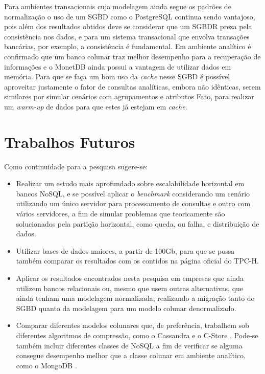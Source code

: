 Para ambientes transacionais cuja modelagem ainda segue os padrões de normalização o uso de um SGBD como o PostgreSQL continua sendo vantajoso, pois além dos resultados obtidos deve se considerar que um SGBDR preza pela consistência nos dados, e para um sistema transacional que envolva transações bancárias, por exemplo, a consistência é fundamental. Em ambiente analítico é confirmado que um banco colunar traz melhor desempenho para a recuperação de informações e o MonetDB ainda possui a vantagem de utilizar dados em memória. Para que se faça um bom uso da \textit{cache} nesse SGBD é possível aproveitar justamente o fator de consultas analíticas, embora não idênticas, serem similares por simular cenários com agrupamentos e atributos Fato, para realizar um \textit{warm-up} de dados para que estes já estejam em \textit{cache}.

\section{Trabalhos Futuros}

Como continuidade para a pesquisa sugere-se:

\begin{itemize}
    \item Realizar um estudo mais aprofundado sobre escalabilidade horizontal em bancos NoSQL, e se possível aplicar o \textit{benchmark} considerando um cenário utilizando um único servidor para processamento de consultas e outro com vários servidores, a fim de simular problemas que teoricamente são solucionados pela partição horizontal, como queda, ou falha, e distribuição de dados.

    \item Utilizar bases de dados maiores, a partir de 100Gb, para que se possa também comparar os resultados com os contidos na página oficial do TPC-H.

    \item Aplicar os resultados encontrados nesta pesquisa em empresas que ainda utilizem bancos relacionais ou, mesmo que usem outras alternativas, que ainda tenham uma modelagem normalizada, realizando a migração tanto do SGBD quanto da modelagem para um modelo colunar denormalizado.

    \item Comparar diferentes modelos colunares que, de preferência, trabalhem sob diferentes algoritmos de compressão, como o Cassandra \cite{cassandra2018nosql} e o C-Store \cite{cstore2018nosql}. Pode-se também incluir diferentes classes de NoSQL a fim de verificar se alguma consegue desempenho melhor que a classe colunar em ambiente analítico, como o MongoDB \cite{mongo2018nosql}.

\end{itemize}
